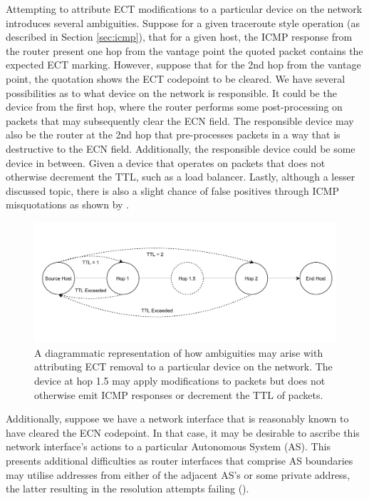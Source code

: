 \documentclass{l4proj}
\begin{document}
Attempting to attribute ECT modifications to a particular device on the network introduces several ambiguities. Suppose for a given traceroute style operation (as described in Section \ref{sec:icmp}), that for a given host, the ICMP response from the router present one hop from the vantage point the quoted packet contains the expected ECT marking. However, suppose that for the 2nd hop from the vantage point, the quotation shows the ECT codepoint to be cleared. We have several possibilities as to what device on the network is responsible. It could be the device from the first hop, where the router performs some post-processing on packets that may subsequently clear the ECN field. The responsible device may also be the router at the 2nd hop that pre-processes packets in a way that is destructive to the ECN field. Additionally, the responsible device could be some device in between. Given a device that operates on packets that does not otherwise decrement the TTL, such as a load balancer. Lastly, although a lesser discussed topic, there is also a slight chance of false positives through ICMP misquotations as shown by \cite{malone_analysis_2007}.

\begin{figure}[H]
\centering
\includegraphics[width=14cm,keepaspectratio]{dissertation/images/ambig_icmp.pdf}
\caption{A diagrammatic representation of how ambiguities may arise with attributing ECT removal to a particular device on the network. The device at hop 1.5 may apply modifications to packets but does not otherwise emit ICMP responses or decrement the TTL of packets.}
\label{fig:icmpambig}
\end{figure}

Additionally, suppose we have a network interface that is reasonably known to have cleared the ECN codepoint. In that case, it may be desirable to ascribe this network interface's actions to a particular Autonomous System (AS). This presents additional difficulties as router interfaces that comprise AS boundaries may utilise addresses from either of the adjacent AS's or some private address, the latter resulting in the resolution attempts failing (\cite{mcquistin_is_2015}).
\end{document}
